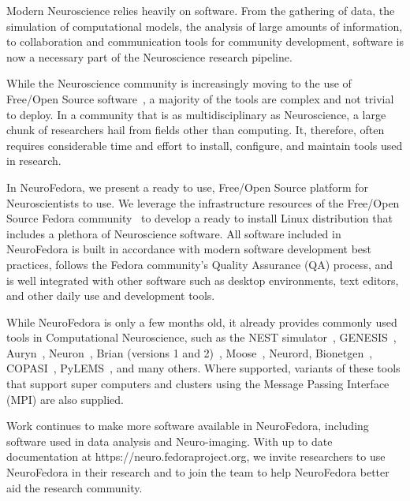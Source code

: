
Modern Neuroscience relies heavily on software.
From the gathering of data, the simulation of computational models, the analysis of large amounts of information, to collaboration and communication tools for community development, software is now a necessary part of the Neuroscience research pipeline.

While the Neuroscience community is increasingly moving to the use of Free/Open Source software~\cite{Stallman2002,Gleeson2017}, a majority of the tools are complex and not trivial to deploy.
In a community that is as multidisciplinary as Neuroscience, a large chunk of researchers hail from fields other than computing.
It, therefore, often requires considerable time and effort to install, configure, and maintain tools used in research.

In NeuroFedora, we present a ready to use, Free/Open Source platform for Neuroscientists to use.
We leverage the infrastructure resources of the Free/Open Source Fedora community~\cite{RedHat2008} to develop a ready to install Linux distribution that includes a plethora of Neuroscience software.
All software included in NeuroFedora is built in accordance with modern software development best practices, follows the Fedora community's Quality Assurance (QA) process, and is well integrated with other software such as desktop environments, text editors, and other daily use and development tools.

While NeuroFedora is only a few months old, it already provides commonly used tools in Computational Neuroscience, such as the NEST simulator~\cite{Linssen2018}, GENESIS~\cite{Bower2003}, Auryn~\cite{Zenke2014}, Neuron~\cite{Hines1997}, Brian (versions 1 and 2)~\cite{Goodman2009}, Moose~\cite{Dudani2009}, Neurord, Bionetgen~\cite{Harris2016}, COPASI~\cite{Mendes2009}, PyLEMS~\cite{Vella2014}, and many others.
Where supported, variants of these tools that support super computers and clusters using the Message Passing Interface (MPI) are also supplied.

Work continues to make more software available in NeuroFedora, including software used in data analysis and Neuro-imaging.
With up to date documentation at https://neuro.fedoraproject.org, we invite researchers to use NeuroFedora in their research and to join the team to help NeuroFedora better aid the research community.
